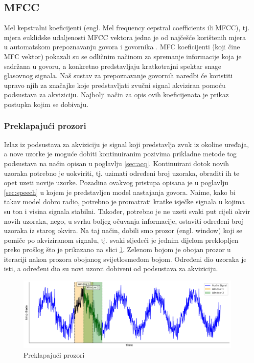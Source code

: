 \subsection{MFCC}
\label{MFCCconstruction}
Mel kepstralni koeficijenti (engl. Mel frequency cepstral coefficients ili MFCC), tj. mjera 
euklidske udaljenosti MFCC vektora jedna je od najčešće korištenih mjera u automatskom 
prepoznavanju govora i govornika \cite{vasilijevic2011perceptual}. 
MFC koeficijenti (koji čine MFC vektor) pokazali su se odličnim načinom za spremanje informacije
koja je sadržana u govoru, a konkretno predstavljaju kratkotrajni spektar snage glasovnog 
signala. Naš sustav za prepoznavanje govornih naredbi će koristiti upravo njih za 
značajke koje predstavljati zvučni signal akviziran pomoću podsustava za akviziciju. 
Najbolji način za opis ovih koeficijenata je prikaz postupka kojim se dobivaju.


\subsubsection{Preklapajući prozori}
\label{sec:win}
Izlaz iz podsustava za akviziciju je signal koji predstavlja zvuk iz okoline uređaja, 
a nove uzorke je moguće dobiti kontinuiranim pozivima prikladne metode tog podsustava
na način opisan u poglavlju \ref{sec:acq}. Kontinuirani dotok novih uzoraka potrebno 
je uokviriti, tj. uzimati određeni broj uzoraka, obraditi ih te opet uzeti novije uzorke. 
Pozadina ovakvog pristupa opisana je u poglavlju \ref{sec:speech} u kojem je predstavljen
model nastajanja govora. Naime, kako bi takav model dobro radio, potrebno je promatrati
kratke isječke signala u kojima su ton i visina signala stabilni. Također, potrebno je
ne uzeti svaki put cijeli okvir novih uzoraka, nego, u svrhu boljeg očuvanja informacije,
ostaviti određeni broj uzoraka iz starog okvira. Na taj način, dobili smo prozor (engl. window)
koji se pomiče po akviziranom signalu, tj. svaki sljedeći je jednim dijelom preklopljen
preko prošlog što je prikazano na slici \ref{pic:sliding}. Zelenom bojom je obojan prozor
u iteraciji nakon prozora obojanog svijetlosmeđom bojom. Određeni dio uzoraka je isti,
a određeni dio su novi uzorci dobiveni od podsustava za akviziciju.

\begin{figure}[htb]
    \centering
    \includegraphics[width=0.8\linewidth]{Chapters/struktura_sustava/generiranje_znacajki/sliding.png} 
    \caption{Preklapajući prozori}
    \label{pic:sliding}
\end{figure}

